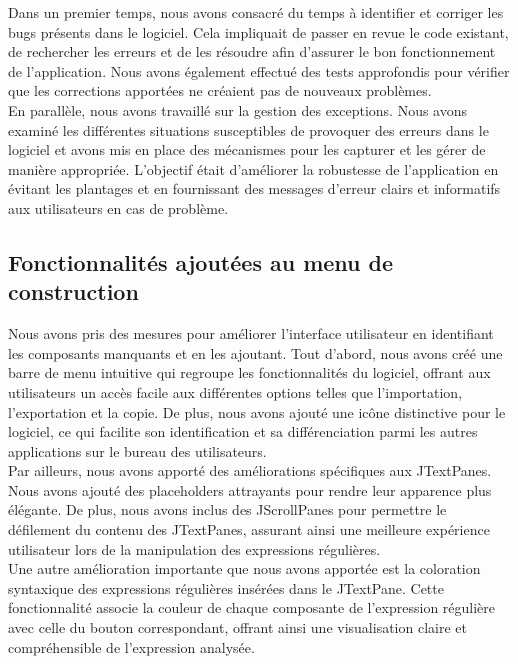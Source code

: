 \documentclass{article}
\begin{document}
Dans un premier temps, nous avons consacré du temps à identifier et corriger les bugs présents dans le logiciel. Cela impliquait de passer en revue le code existant, de rechercher les erreurs et de les résoudre afin d'assurer le bon fonctionnement de l'application. Nous avons également effectué des tests approfondis pour vérifier que les corrections apportées ne créaient pas de nouveaux problèmes.\\

En parallèle, nous avons travaillé sur la gestion des exceptions. Nous avons examiné les différentes situations susceptibles de provoquer des erreurs dans le logiciel et avons mis en place des mécanismes pour les capturer et les gérer de manière appropriée. L'objectif était d'améliorer la robustesse de l'application en évitant les plantages et en fournissant des messages d'erreur clairs et informatifs aux utilisateurs en cas de problème.

\subsection{Fonctionnalités ajoutées au menu de construction}

Nous avons pris des mesures pour améliorer l'interface utilisateur en identifiant les composants manquants et en les ajoutant. Tout d'abord, nous avons créé une barre de menu intuitive qui regroupe les fonctionnalités du logiciel, offrant aux utilisateurs un accès facile aux différentes options telles que l'importation, l'exportation et la copie. De plus, nous avons ajouté une icône distinctive pour le logiciel, ce qui facilite son identification et sa différenciation parmi les autres applications sur le bureau des utilisateurs.\\

Par ailleurs, nous avons apporté des améliorations spécifiques aux JTextPanes. Nous avons ajouté des placeholders attrayants pour rendre leur apparence plus élégante. De plus, nous avons inclus des JScrollPanes pour permettre le défilement du contenu des JTextPanes, assurant ainsi une meilleure expérience utilisateur lors de la manipulation des expressions régulières.\\

Une autre amélioration importante que nous avons apportée est la coloration syntaxique des expressions régulières insérées dans le JTextPane. Cette fonctionnalité associe la couleur de chaque composante de l'expression régulière avec celle du bouton correspondant, offrant ainsi une visualisation claire et compréhensible de l'expression analysée.\\
\end{document}

